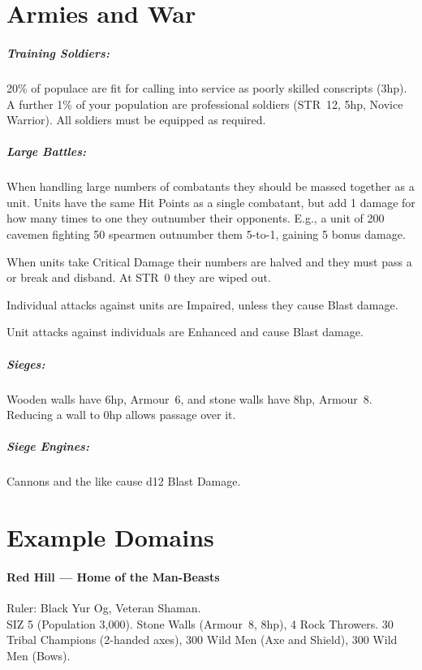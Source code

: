 \documentclass[itdr]{subfiles}
\begin{document}
\section{Armies and War}


\subparagraph{Training Soldiers:} 20\% of populace are fit for calling into service as poorly skilled conscripts (3hp). A further 1\% of your population are professional soldiers (STR~12, 5hp, Novice Warrior). All soldiers must be equipped as required.

\subparagraph{Large Battles:} When handling large numbers of combatants they should be massed together as a unit. Units have the same Hit Points as a single combatant, but add 1 damage for how many times to one they outnumber their opponents. E.g., a unit of 200 cavemen fighting 50 spearmen outnumber them 5-to-1, gaining 5 bonus damage.

When units take Critical Damage their numbers are halved and they must pass a  or break and disband. At STR~0 they are wiped out.

Individual attacks against units are Impaired, unless they cause Blast damage.

Unit attacks against individuals are Enhanced and cause Blast damage.

\subparagraph{Sieges:} Wooden walls have 6hp, Armour~6, and stone walls have 8hp, Armour~8. Reducing a wall to 0hp allows passage over it.

\subparagraph{Siege Engines:} Cannons and the like cause d12 Blast Damage.

\vfill

\section{Example Domains}

\paragraph{Red Hill --- Home of the Man-Beasts}
Ruler: Black Yur Og, Veteran Shaman.\\
SIZ 5 (Population 3,000).
Stone Walls (Armour~8, 8hp), 4 Rock Throwers. 30 Tribal Champions (2-handed axes), 300 Wild Men (Axe and Shield), 300 Wild Men (Bows).
\end{document}
